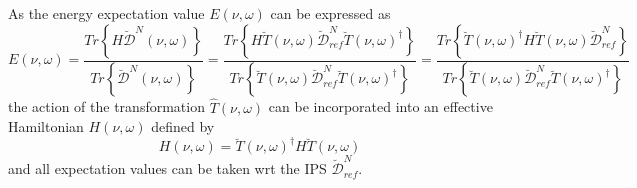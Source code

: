 \documentclass[aps,preprint]{revtex4}%
\begin{document}
As the energy expectation value $E\left(  \nu,\omega\right)  $ can be
expressed as
\begin{equation}
E\left(  \nu,\omega\right)  =\frac{Tr\left\{  H\mathcal{\breve{D}}^{N}\left(
\nu,\omega\right)  \right\}  }{Tr\left\{  \mathcal{\breve{D}}^{N}\left(
\nu,\omega\right)  \right\}  }=\frac{Tr\left\{  H\breve{T}\left(  \nu
,\omega\right)  \mathcal{\breve{D}}_{ref}^{N}\breve{T}\left(  \nu
,\omega\right)  ^{\dagger}\right\}  }{Tr\left\{  \breve{T}\left(  \nu
,\omega\right)  \mathcal{\breve{D}}_{ref}^{N}\breve{T}\left(  \nu
,\omega\right)  ^{\dagger}\right\}  }=\frac{Tr\left\{  \breve{T}\left(
\nu,\omega\right)  ^{\dagger}H\breve{T}\left(  \nu,\omega\right)
\mathcal{\breve{D}}_{ref}^{N}\right\}  }{Tr\left\{  \breve{T}\left(
\nu,\omega\right)  \mathcal{\breve{D}}_{ref}^{N}\breve{T}\left(  \nu
,\omega\right)  ^{\dagger}\right\}  }%
\end{equation}
the action of the transformation $\hat{T}\left(  \nu,\omega\right)  $ can be
incorporated into an effective Hamiltonian $H\left(  \nu,\omega\right)  $
defined by
\begin{equation}
H\left(  \nu,\omega\right)  =\breve{T}\left(  \nu,\omega\right)  ^{\dagger
}H\breve{T}\left(  \nu,\omega\right)
\end{equation}
and all expectation values can be taken wrt the IPS $\mathcal{\breve{D}}%
_{ref}^{N}$.
\end{document}
